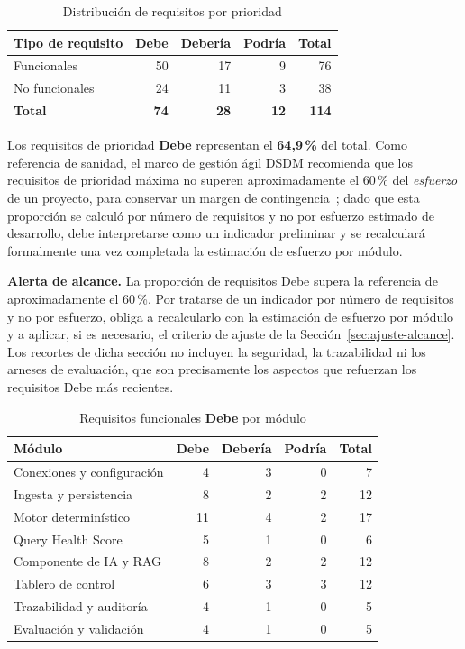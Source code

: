 \documentclass[11pt,a4paper]{report}
\begin{document}
\begin{table}[h]
\centering
\caption{Distribuci\'on de requisitos por prioridad}
\begin{tabular}{lrrrr}
\toprule
\textbf{Tipo de requisito} & \textbf{Debe} & \textbf{Deber\'ia} & \textbf{Podr\'ia} & \textbf{Total} \\
\midrule
Funcionales & 50 & 17 & 9 & 76 \\
No funcionales & 24 & 11 & 3 & 38 \\
\midrule
\textbf{Total} & \textbf{74} & \textbf{28} & \textbf{12} & \textbf{114} \\
\bottomrule
\end{tabular}
\end{table}


Los requisitos de prioridad \textbf{Debe} representan el \textbf{64,9\,\%} del total. Como referencia de sanidad, el marco de gesti\'on \'agil DSDM recomienda que los requisitos de prioridad m\'axima no superen aproximadamente el 60\,\% del \textit{esfuerzo} de un proyecto, para conservar un margen de contingencia~\cite{R24}; dado que esta proporci\'on se calcul\'o por n\'umero de requisitos y no por esfuerzo estimado de desarrollo, debe interpretarse como un indicador preliminar y se recalcular\'a formalmente una vez completada la estimaci\'on de esfuerzo por m\'odulo.

\textbf{Alerta de alcance.} La proporci\'on de requisitos Debe supera la referencia de aproximadamente el 60\,\%. Por tratarse de un indicador por n\'umero de requisitos y no por esfuerzo, obliga a recalcularlo con la estimaci\'on de esfuerzo por m\'odulo y a aplicar, si es necesario, el criterio de ajuste de la Secci\'on~\ref{sec:ajuste-alcance}. Los recortes de dicha secci\'on no incluyen la seguridad, la trazabilidad ni los arneses de evaluaci\'on, que son precisamente los aspectos que refuerzan los requisitos Debe m\'as recientes.



\begin{table}[h]
\centering
\caption{Requisitos funcionales \textbf{Debe} por m\'odulo}
\begin{tabular}{lrrrr}
\toprule
\textbf{M\'odulo} & \textbf{Debe} & \textbf{Deber\'ia} & \textbf{Podr\'ia} & \textbf{Total} \\
\midrule

Conexiones y configuraci\'on & 4 & 3 & 0 & 7 \\
Ingesta y persistencia & 8 & 2 & 2 & 12 \\
Motor determin\'istico & 11 & 4 & 2 & 17 \\
Query Health Score & 5 & 1 & 0 & 6 \\
Componente de IA y RAG & 8 & 2 & 2 & 12 \\
Tablero de control & 6 & 3 & 3 & 12 \\
Trazabilidad y auditor\'ia & 4 & 1 & 0 & 5 \\
Evaluaci\'on y validaci\'on & 4 & 1 & 0 & 5 \\

\bottomrule
\end{tabular}
\end{table}
\end{document}
